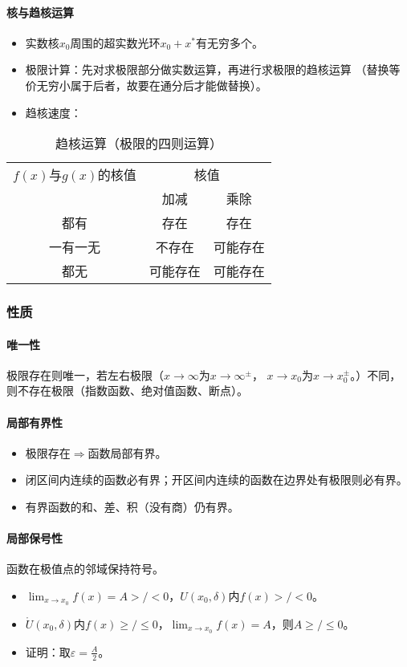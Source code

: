 \documentclass[
12pt, %
a4paper, 
oneside, %
headinclude,footinclude, %
]{scrartcl}
\begin{document}
\paragraph{核与趋核运算}
\begin{itemize}
\item 实数核$ x_0 $周围的超实数光环$ x_0 + x^* $有无穷多个。
\item 极限计算：先对求极限部分做实数运算，再进行求极限的趋核运算
（替换等价无穷小属于后者，故要在通分后才能做替换）。
\item 趋核速度：
\end{itemize}
\begin{table}[hbt]
\caption{趋核运算（极限的四则运算）}
\centering
\begin{tabular}{c|cc}
\toprule
$ f(x) $与$ g(x) $的核值 & \multicolumn{2}{c}{核值} \\
\cmidrule(lr){2-3}
& 加减 & 乘除 \\
\midrule
都有 & 存在 & 存在 \\
一有一无 & 不存在 & 可能存在 \\
都无 & 可能存在 & 可能存在 \\
\bottomrule
\end{tabular}
\end{table}
\subsubsection{性质}
\paragraph{唯一性}
极限存在则唯一，若左右极限（$ x \to \infty $为$ x \to \infty^\pm $，
$ x \to x_0 $为$ x \to x_0^\pm $。）不同，则不存在极限（指数函数、绝对值函数、断点）。
\paragraph{局部有界性}
\begin{itemize}
\item 极限存在$ \Rightarrow $函数局部有界。
\item 闭区间内连续的函数必有界；开区间内连续的函数在边界处有极限则必有界。
\item 有界函数的和、差、积（没有商）仍有界。
\end{itemize}
\paragraph{局部保号性}
函数在极值点的邻域保持符号。
\begin{itemize}
\item $ \lim_{x \to x_0} f(x) = A >/< 0 $，$ U(x_0, \delta) $内$ f(x) >/< 0 $。
\item $ \mathring{U}(x_0, \delta) $内$ f(x) \geq /\leq 0$，$ \lim_{x \to x_0} f(x) = A $，则$ A \geq / \leq 0 $。
\item 证明：取$ \varepsilon = \frac{A}{2} $。
\end{itemize}
\end{document}
